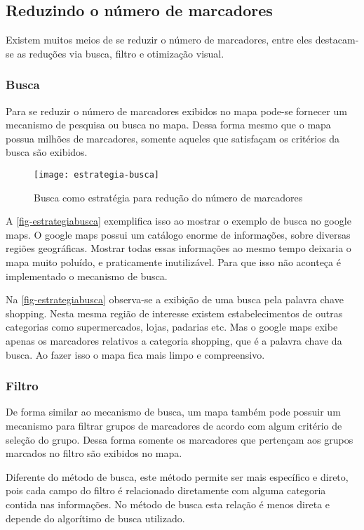   \subsection{Reduzindo o número de marcadores}
  Existem muitos meios de se reduzir o número de marcadores, entre eles destacam-se as reduções via busca, filtro e otimização visual.
	\subsubsection{Busca}
	Para se reduzir  o número de marcadores exibidos no mapa pode-se fornecer um mecanismo de pesquisa ou busca no mapa. Dessa forma mesmo que o mapa possua milhões de marcadores, somente aqueles que satisfaçam os critérios da busca são exibidos.
	
	 \begin{figure}[htb]
	\caption{\label{fig-estrategiabusca}Busca como estratégia para redução do número de marcadores}
	\begin{center}
	    \texttt{[image: estrategia-busca]}
	\end{center}
	\end{figure}
	 
	 A \autoref{fig-estrategiabusca}  exemplifica isso ao mostrar o exemplo de busca no google maps. O google maps possui um catálogo enorme de informações, sobre diversas regiões geográficas. Mostrar todas essas informações ao mesmo tempo deixaria o mapa muito poluído, e praticamente inutilizável. Para que isso não aconteça é implementado o mecanismo de busca.
	
	 Na \autoref{fig-estrategiabusca} observa-se a exibição de uma busca pela palavra chave shopping. Nesta mesma região de interesse existem estabelecimentos de outras categorias como supermercados, lojas, padarias etc. Mas o google maps exibe apenas os marcadores relativos a categoria shopping, que é a palavra chave da busca. Ao fazer isso o mapa fica mais limpo e compreensivo.
	 
	
	\subsubsection{Filtro}
	De forma similar ao mecanismo de busca, um mapa também pode possuir um mecanismo para filtrar grupos de marcadores de acordo com algum critério de seleção do grupo. Dessa forma somente os marcadores que pertençam aos grupos marcados no filtro são exibidos no mapa. 
	
	Diferente do método de busca, este método permite ser mais específico e direto, pois cada campo do filtro é relacionado diretamente com alguma categoria contida nas informações. No método de busca esta relação é menos direta e depende do algorítimo de busca utilizado.  
	
